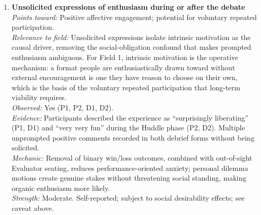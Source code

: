 \documentclass[12pt]{article}
\begin{document}
\begin{enumerate}

\item \textbf{Unsolicited expressions of enthusiasm during or after the debate}\\
\textit{Points toward:} Positive affective engagement; potential for voluntary repeated participation.\\
\textit{Relevance to field:} Unsolicited expressions isolate intrinsic motivation as the causal driver, removing the social-obligation confound that makes prompted enthusiasm ambiguous. For Field 1, intrinsic motivation is the operative mechanism: a format people are enthusiastically drawn toward without external encouragement is one they have reason to choose on their own, which is the basis of the voluntary repeated participation that long-term viability requires.\\
\textit{Observed:} Yes (P1, P2, D1, D2).\\
\textit{Evidence:} Participants described the experience as ``surprisingly liberating'' (P1, D1) and ``very very fun'' during the Huddle phase (P2, D2). Multiple unprompted positive comments recorded in both debrief forms without being solicited.\\
\textit{Mechanic:} Removal of binary win/loss outcomes, combined with out-of-sight Evaluator seating, reduces performance-oriented anxiety; personal dilemma motions create genuine stakes without threatening social standing, making organic enthusiasm more likely.\\
\textit{Strength:} Moderate. Self-reported; subject to social desirability effects; see caveat above.


\end{enumerate}
\end{document}
